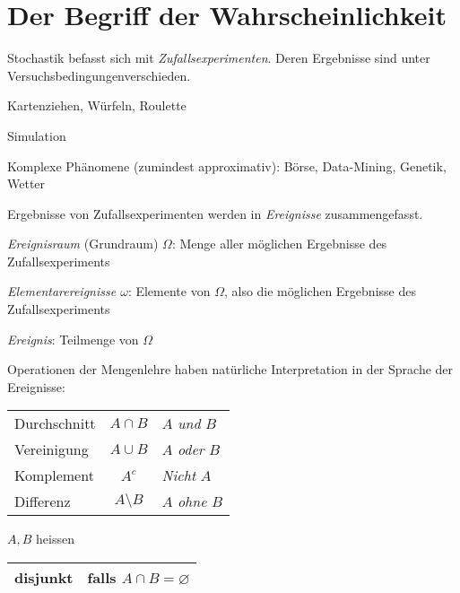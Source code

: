 \chapter{Der Begriff der Wahrscheinlichkeit}
\label{kap1}
Stochastik befasst sich mit \emph{Zufallsexperimenten}. Deren Ergebnisse sind unter \glqq Versuchsbedingungen\grqq verschieden.
\begin{bspl}
	\begin{compactitem}
		\item Kartenziehen, Würfeln, Roulette
		\item Simulation
		\item Komplexe Phänomene (zumindest approximativ): Börse, Data-Mining, Genetik, Wetter
	\end{compactitem}
\end{bspl}
Ergebnisse von Zufallsexperimenten werden in \emph{Ereignisse} zusammengefasst.
\begin{compactitem}
	\item \emph{Ereignisraum} (Grundraum) $\Omega$: Menge aller möglichen Ergebnisse des Zufallsexperiments
	\item \emph{Elementarereignisse $\omega$}: Elemente von $\Omega$, also die möglichen Ergebnisse des Zufallsexperiments
	\item \emph{Ereignis}: Teilmenge von $\Omega$
	\item Operationen der Mengenlehre haben natürliche Interpretation in der Sprache der Ereignisse:\\[-1em]
		\begin{center}
				\begin{tabular}{lcl}
					\toprule
					Durchschnitt	& $A\cap B$			& $A$ \emph{und} $B$	\\
					Vereinigung		& $A\cup B$			& $A$ \emph{oder} $B$	\\
					Komplement		& $A^c$				& \emph{Nicht} $A$	\\
					Differenz		& $A\setminus B$	& $A$ \emph{ohne} $B$ \\
					\bottomrule
				\end{tabular}
		\end{center}
		$A,B$ heissen
		\begin{center}
				\begin{tabular}{lr}
					\toprule
					disjunkt	&falls $A\cap B=\varnothing$			\\
					\bottomrule
				\end{tabular}
		\end{center}
\end{compactitem}

